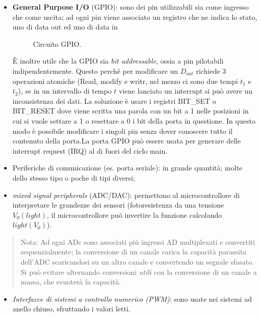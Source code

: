 \documentclass[
]{book}
\providecommand{\tightlist}{%
  \setlength{\itemsep}{0pt}\setlength{\parskip}{0pt}}
\begin{document}
\begin{itemize}
\tightlist
\item
  \textbf{General Purpose I/O} (GPIO): sono dei pin utilizzabili sia
  come ingresso che come uscita; ad ogni pin viene associato un registro
  che ne indica lo stato, uno di data out ed uno di data in

  \begin{figure}[H]
    \centering
    \resizebox{0.5\textwidth}{!}{}
    \caption{Circuito GPIO.}
    \end{figure}

  È inoltre utile che la GPIO sia \emph{bit addressable}, ossia a pin
  pilotabili indipendentemente. Questo perché per modificare un
  \(D_{out}\) richiede 3 operazioni atomiche (Read, modify e writr, nel
  mezzo ci sono due tempi \(t_1\) e \(t_2\)), se in un intervallo di
  tempo \(t\) viene lanciato un interrupt si può avere un inconsistenza
  dei dati. La soluzione è usare i registri BIT\_SET o BIT\_RESET dove
  viene scritta una parola con un bit a 1 nelle posizioni in cui si
  vuole settare a 1 o resettare a 0 i bit della porta in questione. In
  questo modo è possibile modificare i singoli pin senza dover conoscere
  tutto il contenuto della porta.\newline La porta GPIO può essere usata
  per generare delle interrupt request (IRQ) al di fuori del ciclo main.
\item
  Periferiche di comunicazione (es. porta seriale): in grande quantità;
  molte dello stesso tipo o poche di tipi diversi;
\item
  \emph{mixed signal peripherals} (ADC/DAC): permettono al
  microcontrollore di interpretare le grandezze dei sensori
  (fotoresistenza da una tensione \(V_{0}(light)\), il microcontrollore
  può invertire la funzione calcolando \(light(V_{0})\)).
\end{itemize}

\begin{quote}
Nota: Ad ogni ADc sono associati più ingressi AD multiplexati e
convertiti sequenzialmente; la conversione di un canale carica la
capacità parassita dell'ADC scaricandosi su un altro canale e
convertendo un segnale sfasato. Si può evitare alternando conversioni
\emph{utili} con la conversione di un canale a massa, che svuoterà la
capacità.
\end{quote}

\begin{itemize}
\tightlist
\item
  \emph{Interfacce di sistemi a controllo numerico (PWM)}: sono usate
  nei sistemi ad anello chiuso, sfruttando i valori letti.
\end{itemize}
\end{document}
